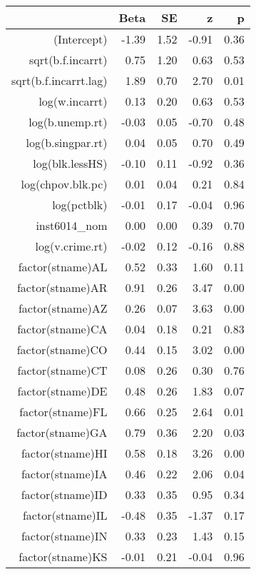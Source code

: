 \begin{table}[ht]
\centering
\begin{tabular}{rrrrr}
  \hline
 & Beta & SE & z & p \\ 
  \hline
(Intercept) & -1.39 & 1.52 & -0.91 & 0.36 \\ 
  sqrt(b.f.incarrt) & 0.75 & 1.20 & 0.63 & 0.53 \\ 
  sqrt(b.f.incarrt.lag) & 1.89 & 0.70 & 2.70 & 0.01 \\ 
  log(w.incarrt) & 0.13 & 0.20 & 0.63 & 0.53 \\ 
  log(b.unemp.rt) & -0.03 & 0.05 & -0.70 & 0.48 \\ 
  log(b.singpar.rt) & 0.04 & 0.05 & 0.70 & 0.49 \\ 
  log(blk.lessHS) & -0.10 & 0.11 & -0.92 & 0.36 \\ 
  log(chpov.blk.pc) & 0.01 & 0.04 & 0.21 & 0.84 \\ 
  log(pctblk) & -0.01 & 0.17 & -0.04 & 0.96 \\ 
  inst6014\_nom & 0.00 & 0.00 & 0.39 & 0.70 \\ 
  log(v.crime.rt) & -0.02 & 0.12 & -0.16 & 0.88 \\ 
  factor(stname)AL & 0.52 & 0.33 & 1.60 & 0.11 \\ 
  factor(stname)AR & 0.91 & 0.26 & 3.47 & 0.00 \\ 
  factor(stname)AZ & 0.26 & 0.07 & 3.63 & 0.00 \\ 
  factor(stname)CA & 0.04 & 0.18 & 0.21 & 0.83 \\ 
  factor(stname)CO & 0.44 & 0.15 & 3.02 & 0.00 \\ 
  factor(stname)CT & 0.08 & 0.26 & 0.30 & 0.76 \\ 
  factor(stname)DE & 0.48 & 0.26 & 1.83 & 0.07 \\ 
  factor(stname)FL & 0.66 & 0.25 & 2.64 & 0.01 \\ 
  factor(stname)GA & 0.79 & 0.36 & 2.20 & 0.03 \\ 
  factor(stname)HI & 0.58 & 0.18 & 3.26 & 0.00 \\ 
  factor(stname)IA & 0.46 & 0.22 & 2.06 & 0.04 \\ 
  factor(stname)ID & 0.33 & 0.35 & 0.95 & 0.34 \\ 
  factor(stname)IL & -0.48 & 0.35 & -1.37 & 0.17 \\ 
  factor(stname)IN & 0.33 & 0.23 & 1.43 & 0.15 \\ 
  factor(stname)KS & -0.01 & 0.21 & -0.04 & 0.96 \\ 

\end{tabular}
\end{table}
